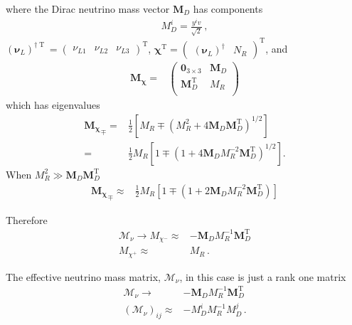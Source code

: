 \begin{frame}
where the Dirac neutrino mass vector $\boldsymbol{M}_D$ has components
\begin{align}
  M_D^i=\frac{y^i v}{\sqrt{2}}\,,
\end{align}
$\left( \boldsymbol{\nu}_{L} \right)^{\dagger\operatorname{T}}=
\begin{pmatrix}\nu_{L1} & \nu_{L2} & \nu_{L3} \end{pmatrix}^{\operatorname{T}}$, $\boldsymbol{\chi}^{\operatorname{T}}=\begin{pmatrix} \left( \boldsymbol{\nu}_L \right)^{\dagger}  & N_R  \end{pmatrix}^{\operatorname{T}}$, and
\begin{align}
  \boldsymbol{M_{\chi}}=& \begin{pmatrix}
   \mathbf{0}_{3 \times 3} &            \boldsymbol{M}_D \\
   \boldsymbol{M}_D^{\operatorname{T}} & M_R \\
 \end{pmatrix}
\end{align}
which has eigenvalues
\begin{align}
{  \boldsymbol{M_{\chi}}}_\mp=&\frac{1}{2} \left[ M_R \mp \left( M_R^2 + 4   \boldsymbol{M}_D   \boldsymbol{M}_D^{\operatorname{T}}  \right)^{1/2} \right] \nonumber\\
  =&\frac{1}{2} M_R\left[ 1 \mp  \left( 1 + 4   \boldsymbol{M}_D M_R^{-2}   \boldsymbol{M}_D ^{\operatorname{T}}  \right)^{1/2} \right].
\end{align}
When $M_R^2 \gg \boldsymbol{M}_D  \boldsymbol{M}_D ^{\operatorname{T}} $
\begin{align}
  { \boldsymbol{M_{\chi}}}_\mp\approx &\frac{1}{2} M_R\left[ 1 \mp  \left( 1 +   2 \boldsymbol{M}_D M_R^{-2}   \boldsymbol{M}_D^{\operatorname{T}}  \right)
   \right]
\end{align}
\end{frame}
\begin{frame}
Therefore
\begin{align}
 \boldsymbol{\mathcal{M}}_{\nu}\to {M_{\chi^-} }\approx&-   \boldsymbol{M}_D M_R^{-1}   \boldsymbol{M}_D^{\operatorname{T}}  \nonumber\\
 M_{\chi^+} \approx&    M_R\,.
\end{align}

The effective neutrino mass matrix, $\boldsymbol{\mathcal{M}}_{\nu}$,  in this case   is just a rank one matrix
\begin{align}
  \boldsymbol{\mathcal{M}}_{\nu}\to&- \boldsymbol{M}_D M_R^{-1} \boldsymbol{M}_D^{\operatorname{T}}\nonumber\\
  \left( {\mathcal{M}}_{\nu} \right)_{ij}\approx&- M_D^i M_R^{-1} M_D^{j}\,.
\end{align}
\end{frame}
